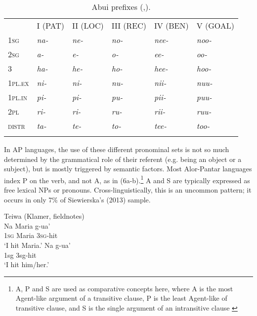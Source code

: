 \begin{table}\centering


\begin{tabular}{llllll}
\hhline{~-----} & {\scshape I (PAT)} & {\scshape II (LOC)} & {\scshape III (REC)} & {\scshape IV (BEN)} & {\scshape V (GOAL)}\\
\hhline{~-----}
1\textsc{sg} & {\itshape na-} & {\itshape ne-} & {\itshape no-} & {\itshape nee-} & {\itshape noo-}\\
2\textsc{sg} & {\itshape a-} & {\itshape e-} & {\itshape o-} & {\itshape ee-} & {\itshape oo-}\\
3 & {\itshape ha-} & {\itshape he-} & {\itshape ho-} & {\itshape hee-} & {\itshape hoo-}\\
{\scshape 1pl.ex} & {\itshape ni-} & {\itshape ni-} & {\itshape nu-} & {\itshape nii-} & {\itshape nuu-}\\
{\scshape 1pl.in} & {\itshape pi-} & {\itshape pi-} & {\itshape pu-} & {\itshape pii-} & {\itshape puu-}\\
{\scshape 2pl} & {\itshape ri-} & {\itshape ri-} & {\itshape ru-} & {\itshape rii-} & {\itshape ruu-}\\
{\scshape distr} & {\itshape ta-} & {\itshape te-} & {\itshape to-} & {\itshape tee-} & {\itshape too-}\\
\hhline{~-----}

\end{tabular}

\caption{Abui prefixes (\citet[78]{Kratochvil2007},\citet[591]{Kratochvil2011}).}
\end{table}

In AP languages, the use of these different pronominal sets is not so much determined by the grammatical role of their referent (e.g. being an object or a subject), but is mostly triggered by semantic factors. Most Alor-Pantar languages index P on the verb, and not A, as in (6a-b).\footnote{A, P and S are used as comparative concepts here, where A is the most Agent-like argument of a transitive clause, P is the least Agent-like of transitive clause, and S is the single argument of an intransitive clause \citep[cf.][]{Comrie1989,Haspelmath2011.}}  A and S are typically expressed as free lexical NPs or pronouns. Cross-linguistically, this is an uncommon pattern; it occurs in only 7\% of Siewierska's (2013) sample.\nocite{Siewierska2013}



\ea%
\label{ex:6}
 Teiwa (Klamer, fieldnotes)  \\
\ea
\gll Na  Maria  g-ua' \\
 1\textsc{sg} Maria  \textsc{3sg-}hit     \\
\glt  `I hit Maria.'
\ex
\gll Na  g-ua' \\
 1sg  3sg-hit    \\
\glt  `I hit him/her.'
\z
\z



